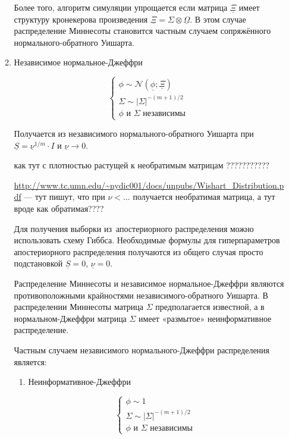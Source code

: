 \documentclass[11pt]{article} %
\newcommand{\cN}{\mathcal{N}}
\newcommand{\prior}{\underline}
\begin{document}
\begin{enumerate}
\begin{enumerate}
Более того, алгоритм симуляции упрощается если матрица $\prior \Xi$
имеет структуру кронекерова произведения $\prior \Xi =  \Sigma \otimes
\prior \Omega $. В этом случае распределение Миннесоты становится
частным случаем сопряжённого нормального-обратного Уишарта.



\item Независимое нормальное-Джеффри


\begin{equation}
\begin{cases}
\phi \sim \cN(\prior\phi; \prior\Xi ) \\
\Sigma \sim |\Sigma|^{-(m+1)/2} \\
\phi \text{ и } \Sigma \text{ независимы }
\end{cases}
\end{equation}




Получается из независимого нормального-обратного Уишарта при $\prior S
= \prior \nu^{1/m}\cdot I$ и  $\prior \nu \to 0$.


как тут с плотностью растущей к необратимым матрицам ???????????

\url{http://www.tc.umn.edu/~nydic001/docs/unpubs/Wishart_Distribution.pdf}
--- тут пишут, что при $\nu <...$ получается необратимая матрица, а
тут вроде как обратимая????



Для получения выборки из~апостериорного распределения можно
использовать схему Гиббса. Необходимые формулы для гиперпараметров
апостериорного распределения получаются из общего случая просто
подстановкой $\prior S=0$, $\prior \nu =0$.



Распределение Миннесоты и независимое нормальное-Джеффри являются
противоположными крайностями независимого-обратного Уишарта. В
распределении Миннесоты матрица $\Sigma$ предполагается известной, а в
нормальном-Джеффри матрица $\Sigma$ имеет «размытое» неинформативное
распределение.



Частным случаем независимого нормального-Джеффри распределения является:


\begin{enumerate}

\item Неинформативное-Джеффри

\begin{equation}
\begin{cases}
\phi \sim 1 \\
\Sigma \sim |\Sigma|^{-(m+1)/2} \\
\phi \text{ и } \Sigma \text{ независимы }
\end{cases}
\end{equation}


\end{enumerate}
\end{enumerate}
\end{enumerate}
\end{document}

